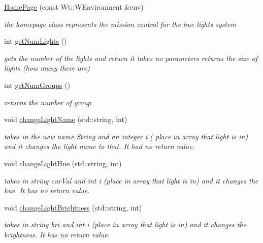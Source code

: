 \begin{DoxyCompactItemize}
\item 
\hyperlink{class_home_page_ae0e5d76697b6796ee71c77555d330eea}{Home\+Page} (const Wt\+::\+W\+Environment \&env)
\begin{DoxyCompactList}\small\item\em the homepage class represents the mission control for the hue lights system \end{DoxyCompactList}\item 
int \hyperlink{class_home_page_a82c2d28ad829b6c8527cec5cefae0104}{get\+Num\+Lights} ()
\begin{DoxyCompactList}\small\item\em gets the number of the lights and return it takes no parameters returns the size of lights (how many there are) \end{DoxyCompactList}\item 
int \hyperlink{class_home_page_a04cc4e1d2ae6d6e1a36c407fa6db8bb4}{get\+Num\+Groups} ()
\begin{DoxyCompactList}\small\item\em returns the number of group \end{DoxyCompactList}\item 
void \hyperlink{class_home_page_adbf50db3ccfa220970c05422495f308a}{change\+Light\+Name} (std\+::string, int)
\begin{DoxyCompactList}\small\item\em takes in the new name String and an integer i ( place in array that light is in) and it changes the light name to that. It had no return value. \end{DoxyCompactList}\item 
void \hyperlink{class_home_page_a5bae10f45d04af24bffdc168e87638a0}{change\+Light\+Hue} (std\+::string, int)
\begin{DoxyCompactList}\small\item\em takes in string cur\+Val and int i (place in array that light is in) and it changes the hue. It has no return value. \end{DoxyCompactList}\item 
void \hyperlink{class_home_page_a748389a4b1b13e026e6d269c4df1f8d5}{change\+Light\+Brightness} (std\+::string, int)
\begin{DoxyCompactList}\small\item\em takes in string bri and int i (place in array that light is in) and it changes the brightness. It has no return value. \end{DoxyCompactList}\item 

\end{DoxyCompactItemize}
